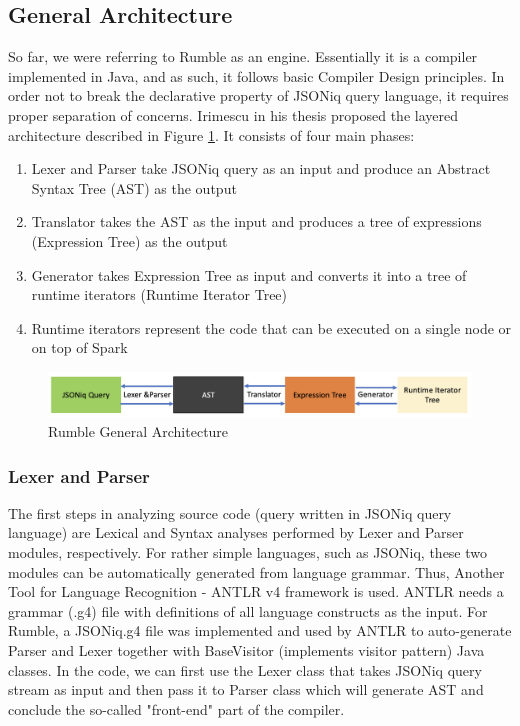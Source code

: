 \subsection{General Architecture}
\label{sec:RumbleArchitecture}
So far, we were referring to Rumble as an engine. Essentially it is a compiler implemented in Java, and as such, it follows basic Compiler Design principles. In order not to break the declarative property of JSONiq query language, it requires proper separation of concerns. Irimescu in his thesis \cite{RumbleThesis} proposed the layered architecture described in Figure \ref{fig:Rumble_General_Architecture}. It consists of four main phases:
\begin{enumerate}
	\item Lexer and Parser take JSONiq query as an input and produce an Abstract Syntax Tree (AST) as the output 
	\item Translator takes the AST as the input and produces a tree of expressions (Expression Tree) as the output
	\item Generator takes Expression Tree as input and converts it into a tree of runtime iterators (Runtime Iterator Tree)
	\item Runtime iterators represent the code that can be executed on a single node or on top of Spark
\end{enumerate} 

\begin{figure}[h!]
	\includegraphics[width=\linewidth]{parsing_architecture.png}
	\caption{Rumble General Architecture}
	\label{fig:Rumble_General_Architecture}
\end{figure}

\subsubsection{Lexer and Parser}
\label{sec:RumbleLexerParser}
The first steps in analyzing source code (query written in JSONiq query language) are Lexical and Syntax analyses performed by Lexer and Parser modules, respectively. For rather simple languages, such as JSONiq, these two modules can be automatically generated from language grammar. Thus, Another Tool for Language Recognition - ANTLR v4 framework \cite{ANTLR} is used. ANTLR needs a grammar (.g4) file with definitions of all language constructs as the input. For Rumble, a JSONiq.g4 file was implemented and used by ANTLR to auto-generate Parser and Lexer together with BaseVisitor (implements visitor pattern) Java classes. In the code, we can first use the Lexer class that takes JSONiq query stream as input and then pass it to Parser class which will generate AST and conclude the so-called "front-end" part of the compiler.

